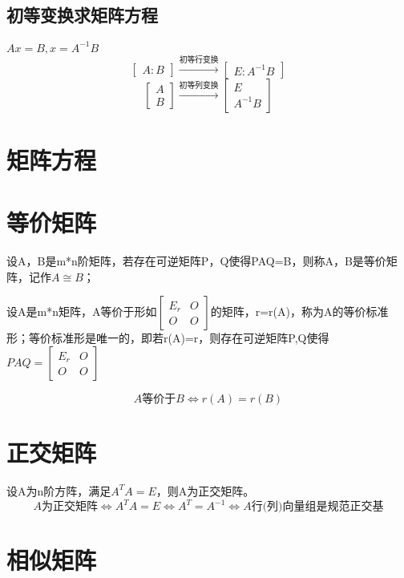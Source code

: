 \subsection{初等变换求矩阵方程}
\(Ax = B, x = A^{-1}B\)
\[
\begin{bmatrix}
A:B
\end{bmatrix}
\xrightarrow{\text{初等行变换}}
\begin{bmatrix}
E:A^{-1}B
\end{bmatrix}
\]
\[
\begin{bmatrix}
A \\ 
B
\end{bmatrix}
\xrightarrow{\text{初等列变换}}
\begin{bmatrix}
E \\ 
A^{-1}B
\end{bmatrix}
\]



\section{矩阵方程}


\section{等价矩阵}

设A，B是m*n阶矩阵，若存在可逆矩阵P，Q使得PAQ=B，则称A，B是等价矩阵，记作\(A \cong B\)；

设A是m*n矩阵，A等价于形如\(
\begin{bmatrix}
E_r & O \\ 
O & O
\end{bmatrix}
\)的矩阵，r=r(A)，称为A的等价标准形；等价标准形是唯一的，即若r(A)=r，则存在可逆矩阵P,Q使得\(PAQ = 
\begin{bmatrix}
E_r & O \\ 
O & O
\end{bmatrix}\)

\[A \text{等价于} B \Leftrightarrow r(A) = r(B)\]
\mymatrix


\section{正交矩阵}
设A为n阶方阵，满足\(A^TA = E\)，则A为正交矩阵。
\[A\text{为正交矩阵} \Leftrightarrow A^TA = E \Leftrightarrow A^T = A^{-1} \Leftrightarrow A\text{行(列)向量组是规范正交基}\]


\section{相似矩阵}

